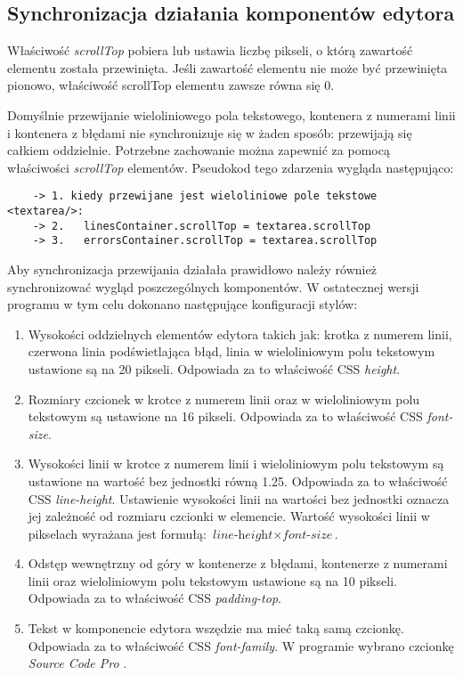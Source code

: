 \documentclass[a4paper,12pt]{book}
\theoremstyle{definition}
\begin{document}
\subsection{Synchronizacja działania komponentów edytora}

Właściwość \textit{scrollTop} pobiera lub ustawia liczbę pikseli, o którą zawartość elementu została przewinięta. Jeśli zawartość elementu nie może być przewinięta pionowo, właściwość scrollTop elementu zawsze równa się 0.

Domyślnie przewijanie wieloliniowego pola tekstowego, kontenera z numerami linii i kontenera z błędami nie synchronizuje się w żaden sposób: przewijają się całkiem oddzielnie. Potrzebne zachowanie można zapewnić za pomocą właściwości \textit{scrollTop} elementów. Pseudokod tego zdarzenia wygląda następująco:

\begin{verbatim}
    -> 1. kiedy przewijane jest wieloliniowe pole tekstowe <textarea/>:
    -> 2.   linesContainer.scrollTop = textarea.scrollTop
    -> 3.   errorsContainer.scrollTop = textarea.scrollTop
\end{verbatim}

Aby synchronizacja przewijania działała prawidłowo należy również synchronizować wygląd poszczególnych komponentów. W ostatecznej wersji programu w tym celu dokonano następujące konfiguracji stylów:

\begin{enumerate}
    \item Wysokości oddzielnych elementów edytora takich jak: krotka z numerem linii, czerwona linia podświetlająca błąd, linia w wieloliniowym polu tekstowym ustawione są na 20 pikseli. Odpowiada za to właściwość CSS \textit{height}.
    \item Rozmiary czcionek w krotce z numerem linii oraz w wieloliniowym polu tekstowym są ustawione na 16 pikseli. Odpowiada za to właściwość CSS \textit{font-size}.
    \item Wysokości linii w krotce z numerem linii i wieloliniowym polu tekstowym są ustawione na wartość bez jednostki równą 1.25. Odpowiada za to właściwość CSS \textit{line-height}. Ustawienie wysokości linii na wartości bez jednostki oznacza jej zależność od rozmiaru czcionki w elemencie. Wartość wysokości linii w pikselach wyrażana jest formułą: $\textit{line-height} \times \textit{font-size}$.
    \item Odstęp wewnętrzny od góry w kontenerze z błędami, kontenerze z numerami linii oraz wieloliniowym polu tekstowym ustawione są na 10 pikseli. Odpowiada za to właściwość CSS \textit{padding-top}.
    \item Tekst w komponencie edytora wszędzie ma mieć taką samą czcionkę. Odpowiada za to właściwość CSS \textit{font-family}. W programie wybrano czcionkę \textit{Source Code Pro} \cite{fontSourceCodePro}.
\end{enumerate}
\end{document}
